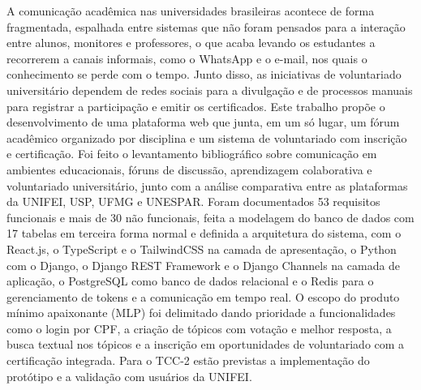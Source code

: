 A comunicação acadêmica nas universidades brasileiras acontece de forma
fragmentada, espalhada entre sistemas que não foram pensados para a interação
entre alunos, monitores e professores, o que acaba levando os estudantes a
recorrerem a canais informais, como o WhatsApp e o e-mail, nos quais o
conhecimento se perde com o tempo. Junto disso, as iniciativas de voluntariado
universitário dependem de redes sociais para a divulgação e de processos manuais
para registrar a participação e emitir os certificados. Este trabalho propõe o
desenvolvimento de uma plataforma web que junta, em um só lugar, um fórum
acadêmico organizado por disciplina e um sistema de voluntariado com inscrição e
certificação. Foi feito o levantamento bibliográfico sobre comunicação em
ambientes educacionais, fóruns de discussão, aprendizagem colaborativa e
voluntariado universitário, junto com a análise comparativa entre as plataformas
da UNIFEI, USP, UFMG e UNESPAR. Foram documentados 53 requisitos funcionais e
mais de 30 não funcionais, feita a modelagem do banco de dados com 17 tabelas em
terceira forma normal e definida a arquitetura do sistema, com o React.js, o
TypeScript e o TailwindCSS na camada de apresentação, o Python com o Django, o
Django REST Framework e o Django Channels na camada de aplicação, o PostgreSQL
como banco de dados relacional e o Redis para o gerenciamento de tokens e a
comunicação em tempo real. O escopo do produto mínimo apaixonante (MLP) foi
delimitado dando prioridade a funcionalidades como o login por CPF, a criação de
tópicos com votação e melhor resposta, a busca textual nos tópicos e a inscrição
em oportunidades de voluntariado com a certificação integrada. Para o TCC-2
estão previstas a implementação do protótipo e a validação com usuários da
UNIFEI.
